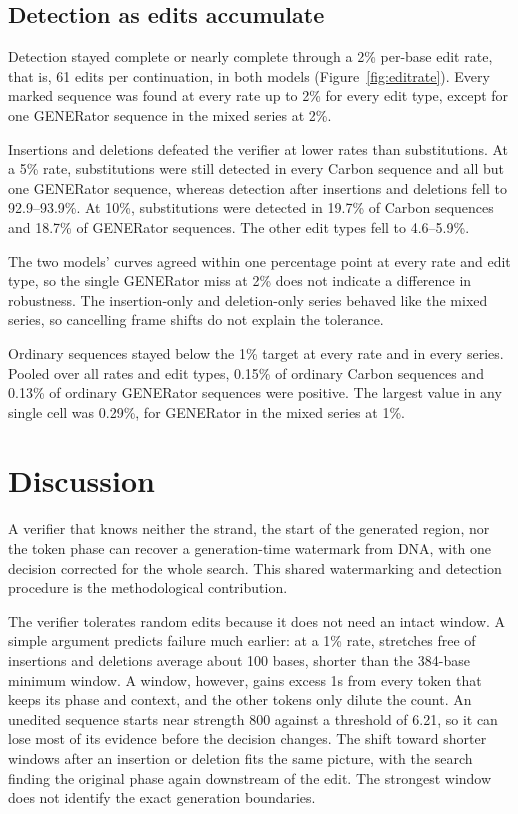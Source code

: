 \documentclass[10pt,twocolumn]{article}
\begin{document}
\subsection{Detection as edits accumulate}
\label{sec:edit-rate}

Detection stayed complete or nearly complete through a 2\% per-base edit rate, that is, 61 edits
per continuation, in both models (Figure~\ref{fig:editrate}). Every marked sequence was found at every
rate up to 2\% for every edit type, except for one GENERator sequence in the mixed series at 2\%.

Insertions and deletions defeated the verifier at lower rates than substitutions. At a 5\% rate,
substitutions were still detected in every Carbon sequence and all but one GENERator sequence, whereas
detection after insertions and deletions fell to 92.9--93.9\%. At 10\%, substitutions were
detected in 19.7\% of Carbon sequences and 18.7\% of GENERator sequences. The other edit types fell to
4.6--5.9\%.

The two models' curves agreed within one percentage point at every rate and edit type, so the
single GENERator miss at 2\% does not indicate a difference in robustness. The insertion-only and
deletion-only series behaved like the mixed series, so cancelling frame shifts do not explain the
tolerance.

Ordinary sequences stayed below the 1\% target at every rate and in every series. Pooled over all
rates and edit types, 0.15\% of ordinary Carbon sequences and 0.13\% of ordinary GENERator sequences were
positive. The largest value in any single cell was 0.29\%, for GENERator in the mixed series at
1\%.

\section{Discussion}

A verifier that knows neither the strand, the start of the generated region, nor the token phase
can recover a generation-time watermark from DNA, with one decision corrected for the whole search.
This shared watermarking and detection procedure is the methodological contribution.

The verifier tolerates random edits because it does not need an intact window. A simple argument
predicts failure much earlier: at a 1\% rate, stretches free of insertions and deletions average
about 100 bases, shorter than the 384-base minimum window. A window, however, gains excess 1s from
every token that keeps its phase and context, and the other tokens only dilute the count. An
unedited sequence starts near strength 800 against a threshold of 6.21, so it can lose most of its
evidence before the decision changes. The shift toward shorter windows after an insertion or
deletion fits the same picture, with the search finding the original phase again downstream of the
edit. The strongest window does not identify the exact generation boundaries.
\end{document}
